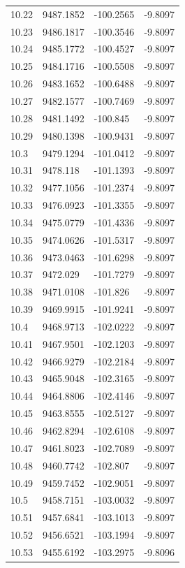 \begin{table}[H]
\begin{tabular}{llll}
10.22 & 9487.1852 & -100.2565 & -9.8097 \\
10.23 & 9486.1817 & -100.3546 & -9.8097 \\
10.24 & 9485.1772 & -100.4527 & -9.8097 \\
10.25 & 9484.1716 & -100.5508 & -9.8097 \\
10.26 & 9483.1652 & -100.6488 & -9.8097 \\
10.27 & 9482.1577 & -100.7469 & -9.8097 \\
10.28 & 9481.1492 & -100.845 & -9.8097 \\
10.29 & 9480.1398 & -100.9431 & -9.8097 \\
10.3 & 9479.1294 & -101.0412 & -9.8097 \\
10.31 & 9478.118 & -101.1393 & -9.8097 \\
10.32 & 9477.1056 & -101.2374 & -9.8097 \\
10.33 & 9476.0923 & -101.3355 & -9.8097 \\
10.34 & 9475.0779 & -101.4336 & -9.8097 \\
10.35 & 9474.0626 & -101.5317 & -9.8097 \\
10.36 & 9473.0463 & -101.6298 & -9.8097 \\
10.37 & 9472.029 & -101.7279 & -9.8097 \\
10.38 & 9471.0108 & -101.826 & -9.8097 \\
10.39 & 9469.9915 & -101.9241 & -9.8097 \\
10.4 & 9468.9713 & -102.0222 & -9.8097 \\
10.41 & 9467.9501 & -102.1203 & -9.8097 \\
10.42 & 9466.9279 & -102.2184 & -9.8097 \\
10.43 & 9465.9048 & -102.3165 & -9.8097 \\
10.44 & 9464.8806 & -102.4146 & -9.8097 \\
10.45 & 9463.8555 & -102.5127 & -9.8097 \\
10.46 & 9462.8294 & -102.6108 & -9.8097 \\
10.47 & 9461.8023 & -102.7089 & -9.8097 \\
10.48 & 9460.7742 & -102.807 & -9.8097 \\
10.49 & 9459.7452 & -102.9051 & -9.8097 \\
10.5 & 9458.7151 & -103.0032 & -9.8097 \\
10.51 & 9457.6841 & -103.1013 & -9.8097 \\
10.52 & 9456.6521 & -103.1994 & -9.8097 \\
10.53 & 9455.6192 & -103.2975 & -9.8096 \\

\end{tabular}
\end{table}
